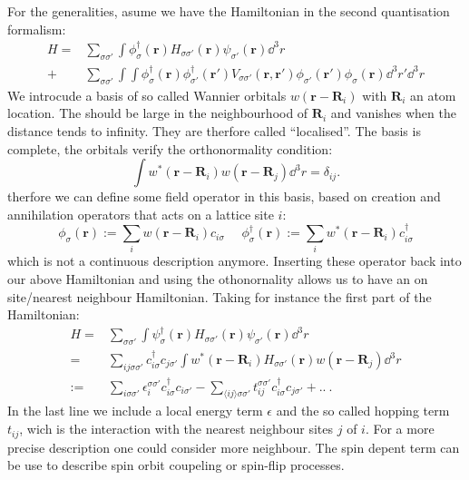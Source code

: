 \documentclass[../main.tex]{subfile}
\begin{document}
For the generalities, asume we have the Hamiltonian in the second quantisation formalism:
\begin{align*}
    H = & \sum_{\sigma\sigma'} \int \phi_{\sigma}^{\dagger}(\bm{r}) H_{\sigma\sigma'}(\bm{r}) \psi_{\sigma'}(\bm{r}) \dd^3r\\
    + & \sum_{\sigma\sigma'} \int \int \phi_{\sigma}^{\dagger}(\bm{r})\phi_{\sigma'}^{\dagger}(\bm{r}') V_{\sigma\sigma'}(\bm{r},\bm{r}') \phi_{\sigma'}(\bm{r}')\phi_{\sigma}(\bm{r}) \dd^3r'\dd^3r 
\end{align*}
We introcude a basis of so called Wannier orbitals $w(\bm{r} - \bm{R}_i)$ with $\bm{R}_i$ an atom location. The should be large in the neighbourhood of $\bm{R}_i$ and vanishes when the distance tends to infinity.
They are therfore called ``localised''. The basis is complete, the orbitals verify the orthonormality condition:
\[
    \int w^{\ast}(\bm{r} - \bm{R}_i) w(\bm{r} - \bm{R}_j) \dd^3r = \delta_{ij}.
\]
therfore we can define some field operator in this basis, based on creation and annihilation operators that acts on a lattice site $i$:
\begin{equation}\label{eq:Wannier_fieldOp}
    \phi_{\sigma}(\bm{r}) := \sum_{i} w(\bm{r} - \bm{R}_i) c_{i\sigma} ~~~~~~ \phi_{\sigma}^{\dagger}(\bm{r}) := \sum_{i} w^{\ast}(\bm{r} - \bm{R}_i) c_{i\sigma}^{\dagger}
\end{equation}
which is not a continuous description anymore. 
Inserting these operator back into our above Hamiltonian and using the othonornality allows us to have an on site/nearest neighbour Hamiltonian. Taking for
instance the first part of the Hamiltonian:
\begin{align*}
    H = & \sum_{\sigma\sigma'} \int \psi_{\sigma}^{\dagger}(\bm{r}) H_{\sigma\sigma'}(\bm{r}) \psi_{\sigma'}(\bm{r}) \dd^3r\\
    =& \sum_{ij\sigma\sigma'} c_{i\sigma}^{\dagger} c_{j\sigma'}\int w^{\ast}(\bm{r} - \bm{R}_i) H_{\sigma\sigma'}(\bm{r}) w(\bm{r} - \bm{R}_j) \dd^3r\\
    := & \sum_{i\sigma\sigma'} \epsilon_i^{\sigma\sigma'} c_{i\sigma}^{\dagger} c_{i\sigma'} - \sum_{\langle ij\rangle\sigma\sigma'} t_{ij}^{\sigma\sigma'} c_{i\sigma}^{\dagger} c_{j\sigma'} + ..~.   
\end{align*}
In the last line we include a local energy term $\epsilon$ and the so called hopping term $t_{ij}$, wich is the interaction with the nearest neighbour sites $j$ of $i$.
For a more precise description one could consider more neighbour. The spin depent term can be use to describe spin orbit coupeling or spin-flip processes.\\
\end{document}
